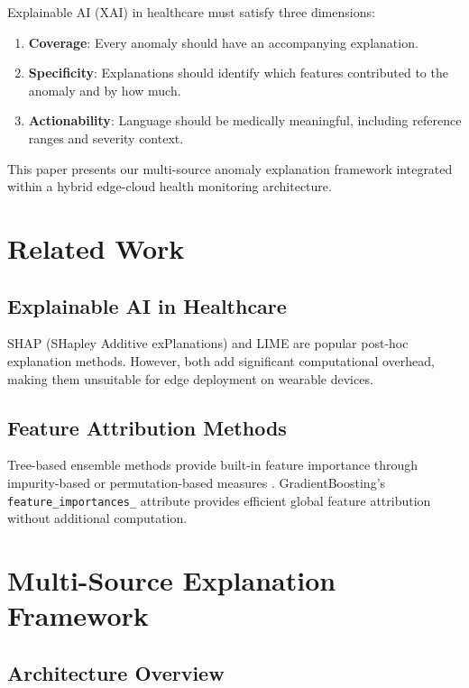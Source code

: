 \documentclass[conference]{IEEEtran}
\begin{document}
Explainable AI (XAI) in healthcare must satisfy three dimensions:
\begin{enumerate}
    \item \textbf{Coverage}: Every anomaly should have an accompanying explanation.
    \item \textbf{Specificity}: Explanations should identify which features contributed to the anomaly and by how much.
    \item \textbf{Actionability}: Language should be medically meaningful, including reference ranges and severity context.
\end{enumerate}

This paper presents our multi-source anomaly explanation framework integrated within a hybrid edge-cloud health monitoring architecture.

\section{Related Work}
\subsection{Explainable AI in Healthcare}
SHAP (SHapley Additive exPlanations) \cite{shap} and LIME \cite{lime} are popular post-hoc explanation methods. However, both add significant computational overhead, making them unsuitable for edge deployment on wearable devices.

\subsection{Feature Attribution Methods}
Tree-based ensemble methods provide built-in feature importance through impurity-based or permutation-based measures \cite{rf_importance}. GradientBoosting's \texttt{feature\_importances\_} attribute provides efficient global feature attribution without additional computation.

\section{Multi-Source Explanation Framework}

\subsection{Architecture Overview}
\end{document}
